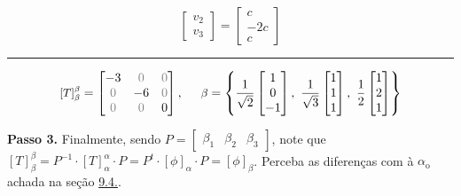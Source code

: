 {{\[\begin{bmatrix}
v_2 \\ 
v_3
\end{bmatrix} = \begin{bmatrix}
c \\ 
-2c \\ 
c
\end{bmatrix}\]
}
\hrule
{\small \vspace{0.3cm}\[
\text{\small $[T]_\beta^\beta $} = \begin{bmatrix}
    -3 & \textcolor{gray}{0}& \textcolor{gray}{0} \\ 
    \textcolor{gray}{0}& -6 &  \textcolor{gray}{0} \\ 
    \textcolor{gray}{0}& \textcolor{gray}{0} & 0
\end{bmatrix}, \hspace{0.5cm}
\text{\small $\beta$} = \left\{\frac{1}{\sqrt{2}}\begin{bmatrix}
1 \\ 
0\\ 
-1
\end{bmatrix}, \ \frac{1}{\sqrt{3}}\begin{bmatrix}
1 \\ 
1\\ 
1
\end{bmatrix}, \ \frac{1}{2}\begin{bmatrix}
1 \\ 
2\\ 
1
\end{bmatrix}\right\}\]}
\par\noindent \textbf{Passo 3.} Finalmente, sendo \(P = \begin{bmatrix} 
    \beta_1 & \beta_2 & \beta_3
\end{bmatrix}\), note que  \([T]_\beta^\beta  = P^{-1} \cdot [T]_\alpha^\alpha \cdot P = P^t \cdot [\phi]_\alpha \cdot P = [\phi]_\beta\). Perceba as diferenças com à \(\alpha_\text{o}\) achada na seção \hyperlink{ex94sim}{9.4.}. 
}